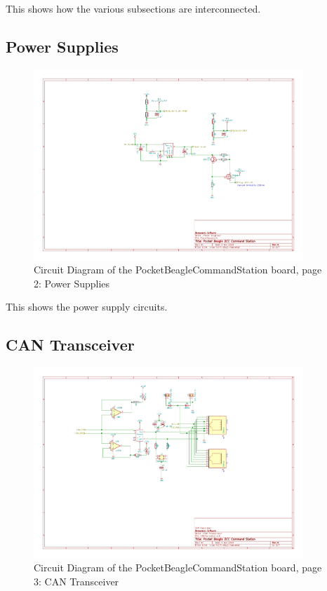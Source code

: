 This shows how the various subsections are interconnected.
\clearpage
\subsection{Power Supplies}
\begin{figure}[hbpt]\begin{centering}%
\includegraphics[width=4in]{PocketBeagleCommandStation-2.pdf}
\caption{Circuit Diagram of the PocketBeagleCommandStation board, page 2: 
Power Supplies}
\end{centering}\end{figure} 

This shows the power supply circuits.
\clearpage
\subsection{CAN Transceiver}
\begin{figure}[hbpt]\begin{centering}%
\includegraphics[width=4in]{PocketBeagleCommandStation-3.pdf}
\caption{Circuit Diagram of the PocketBeagleCommandStation board, page 3: CAN 
Transceiver}
\end{centering}\end{figure}

